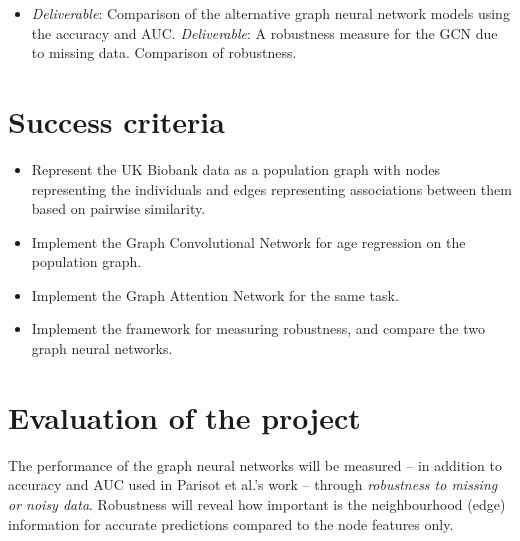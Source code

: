 \documentclass[12pt,a4paper,twoside]{article}
\begin{document}
\begin{itemize}
  \item  \textit{Deliverable}: Comparison of the alternative graph neural network models using the accuracy and AUC. \textit{Deliverable}: A robustness measure for the GCN due to missing data. Comparison of robustness.
\end{itemize}

\section*{Success criteria}
\begin{itemize}
  \item Represent the UK Biobank data as a population graph with nodes representing the individuals and edges representing associations between them based on pairwise similarity.
  \item Implement the Graph Convolutional Network for age regression on the population graph.
  \item Implement the Graph Attention Network for the same task.
  \item Implement the framework for measuring robustness, and compare the two graph neural networks.
\end{itemize}

\section*{Evaluation of the project}
The performance of the graph neural networks will be measured – in addition to accuracy and AUC used in Parisot et al.'s work \cite{parisot2018disease} – through \textit{robustness to missing or noisy data}. Robustness will reveal how important is the neighbourhood (edge) information for accurate predictions compared to the node features only.
\end{document}
